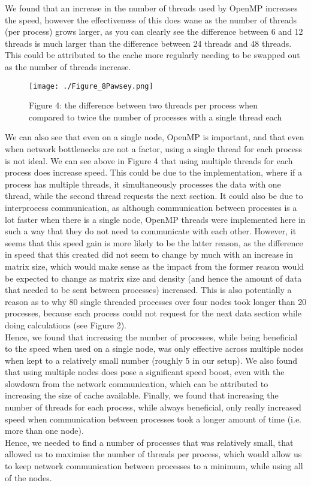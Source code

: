 \documentclass[11pt,leqno]{article}
\begin{document}
\begin{flushleft}
We found that an increase in the number of threads used by OpenMP
increases the speed, however the effectiveness of this does wane as the
number of threads (per process) grows larger, as you can clearly see the
difference between 6 and 12 threads is much larger than the difference
between 24 threads and 48 threads. This could be attributed to the cache
more regularly needing to be swapped out as the number of threads
increase. \\[2 ex]

\begin{figure}[h!]
\centering
\texttt{[image: ./Figure\_8Pawsey.png]}
\caption{Figure 4: the difference between two threads per process when
compared to twice the number of processes with a single thread each}
\end{figure}

We can also see that even on a single node, OpenMP is important, and that even when network bottlenecks are not a factor, using a single
thread for each process is not ideal. We can see above in Figure 4 that using multiple threads for each process does increase speed. This could be due to the implementation, where if a process has multiple threads, it simultaneously processes the data with one thread, while the second thread requests the next section. It could also be due to interprocess communication, as although communication between processes is a lot faster when there is a single node, OpenMP threads were implemented here in such a way that they do not need to communicate with each other. However, it seems that this speed gain is more likely to be the latter reason, as the difference in speed that this created did not seem to change by much with an increase in matrix size, which would make sense as the impact from the former reason would be expected to change as matrix size and density (and hence the amount of data that needed to be sent between processes) increased. This is also potentially a reason as to why 80 single threaded processes over four nodes took longer than 20 processes, because each process could not request for the next data section while doing calculations (see Figure 2). \\[2 ex]

Hence, we found that increasing the number of processes, while being
beneficial to the speed when used on a single node, was only effective
across multiple nodes when kept to a relatively small number (roughly 5
in our setup). We also found that using multiple nodes does pose a
significant speed boost, even with the slowdown from the network
communication, which can be attributed to increasing the size of cache
available. Finally, we found that increasing the number of threads for
each process, while always beneficial, only really increased speed when
communication between processes took a longer amount of time (i.e. more
than one node).\\[2 ex]
Hence, we needed to find a number of processes that was relatively
small, that allowed us to maximise the number of threads per process,
which would allow us to keep network communication between processes to a
minimum, while using all of the nodes.


\end{flushleft}
\end{document}
